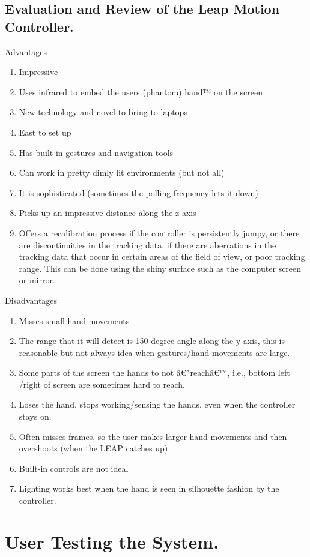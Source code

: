 \documentclass[a4paper, 11pt]{article}
\begin{document}
\subsection {Evaluation and Review of the Leap Motion Controller.}
Advantages
\begin{enumerate}
\item{Impressive}
\item{Uses infrared to embed the users (phantom) hand™ on the screen}
\item{New technology and novel to bring to laptops}
\item{East to set up}
\item{Has built in gestures and navigation tools}
\item{Can work in pretty dimly lit environments (but not all)}
\item{It is sophisticated (sometimes the polling frequency lets it down)}
\item{Picks up an impressive distance along the z axis}
\item{Offers a recalibration process if the controller is persistently jumpy, or there are discontinuities in the tracking data, if there are aberrations in the tracking data that occur in certain areas of the field of view, or poor tracking range. This can be done using the shiny surface such as the computer screen or mirror.}
\end{enumerate}	
Disadvantages
\begin{enumerate}
\item{Misses small hand movements}
\item{The range that it will detect is 150 degree angle along the y axis, this is reasonable but not always idea when gestures/hand movements are large.}
\item{Some parts of the screen the hands to not â€˜reachâ€™, i.e., bottom left /right of screen are sometimes hard to reach.}
\item{Loses the hand, stops working/sensing the hands, even when the controller stays on.}
\item{Often misses frames, so the user makes larger hand movements and then overshoots (when the LEAP catches up)}
\item{Built-in controls are not ideal}
\item{Lighting works best when the hand is seen in silhouette fashion by the controller. }
\end{enumerate}


\section{User Testing the System.}
\end{document}
